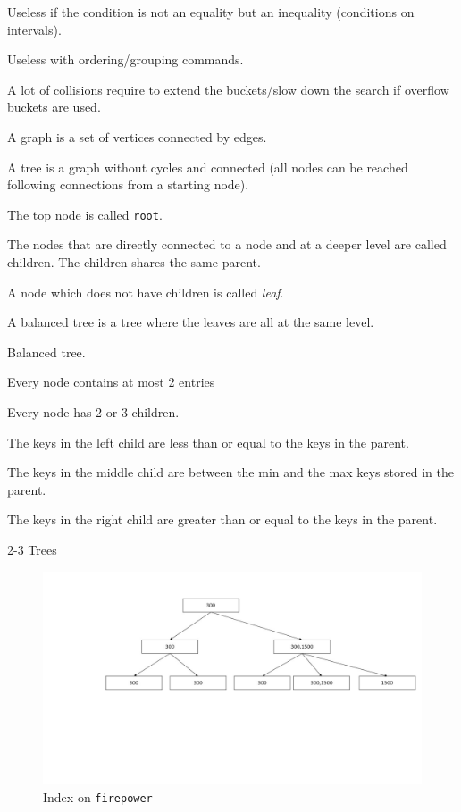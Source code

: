\documentclass{beamer}
\begin{document}
\begin{slide}{
\item Useless if the condition is not an equality but an inequality (conditions on intervals).
\item Useless with ordering/grouping commands.
\item A lot of collisions require to extend the buckets/slow down the search if overflow buckets are used.
}\end{slide}

\begin{slide}{
\item A graph is a set of vertices connected by edges.
\item A tree is a graph without cycles and connected (all nodes can be reached following connections from a starting node).
\item The top node is called \texttt{root}.
\item The nodes that are directly connected to a node and at a deeper level are called children. The children shares the same parent.
\item A node which does not have children is called \textit{leaf}.
\item A balanced tree is a tree where the leaves are all at the same level.
}\end{slide}

\begin{slide}{
\item Balanced tree.
\item Every node contains at most 2 entries
\item Every node has 2 or 3 children.
\item The keys in the left child are less than or equal to the keys in the parent.
\item The keys in the middle child are between the min and the max keys stored in the parent.
\item The keys in the right child are greater than or equal to the keys in the parent.
}\end{slide}

\begin{frame}{2-3 Trees}
\begin{figure}
\centering
\includegraphics[scale=0.3]{img/tree2}
\caption{Index on \texttt{firepower}}
\end{figure}
\end{frame}
\end{document}
